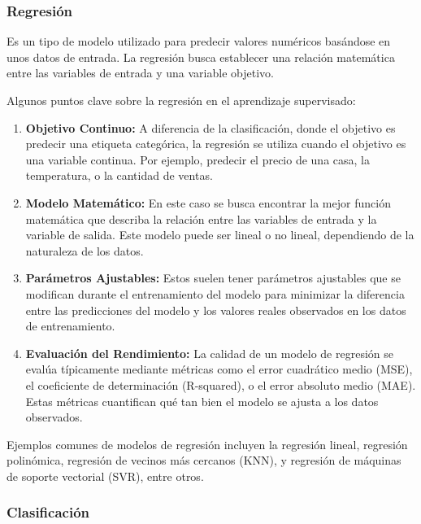 \documentclass[
]{article}
\begin{document}
\hypertarget{regresiuxf3n-1}{%
\subsubsection{Regresión}\label{regresiuxf3n-1}}

Es un tipo de modelo utilizado para predecir valores numéricos basándose
en unos datos de entrada. La regresión busca establecer una relación
matemática entre las variables de entrada y una variable objetivo.

Algunos puntos clave sobre la regresión en el aprendizaje supervisado:

\begin{enumerate}
\def\labelenumi{\arabic{enumi}.}
\item
  \textbf{Objetivo Continuo:} A diferencia de la clasificación, donde el
  objetivo es predecir una etiqueta categórica, la regresión se utiliza
  cuando el objetivo es una variable continua. Por ejemplo, predecir el
  precio de una casa, la temperatura, o la cantidad de ventas.
\item
  \textbf{Modelo Matemático:} En este caso se busca encontrar la mejor
  función matemática que describa la relación entre las variables de
  entrada y la variable de salida. Este modelo puede ser lineal o no
  lineal, dependiendo de la naturaleza de los datos.
\item
  \textbf{Parámetros Ajustables:} Estos suelen tener parámetros
  ajustables que se modifican durante el entrenamiento del modelo para
  minimizar la diferencia entre las predicciones del modelo y los
  valores reales observados en los datos de entrenamiento.
\item
  \textbf{Evaluación del Rendimiento:} La calidad de un modelo de
  regresión se evalúa típicamente mediante métricas como el error
  cuadrático medio (MSE), el coeficiente de determinación (R-squared), o
  el error absoluto medio (MAE). Estas métricas cuantifican qué tan bien
  el modelo se ajusta a los datos observados.
\end{enumerate}

Ejemplos comunes de modelos de regresión incluyen la regresión lineal,
regresión polinómica, regresión de vecinos más cercanos (KNN), y
regresión de máquinas de soporte vectorial (SVR), entre otros.

\hypertarget{clasificaciuxf3n}{%
\subsubsection{Clasificación}\label{clasificaciuxf3n}}
\end{document}
